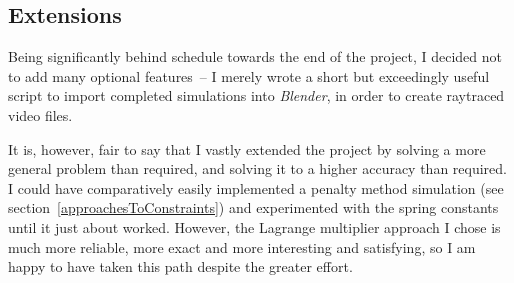 \subsection{Extensions}

Being significantly behind schedule towards the end of the project, I decided not to add many
optional features~-- I merely wrote a short but exceedingly useful script to import completed
simulations into \textsl{Blender}, in order to create raytraced video files.

It is, however, fair to say that I vastly extended the project by solving a more general problem
than required, and solving it to a higher accuracy than required. I could have comparatively
easily implemented a penalty method simulation (see section~\ref{approachesToConstraints}) and
experimented with the spring constants until it just about worked. However, the Lagrange
multiplier approach I chose is much more reliable, more exact and more interesting and satisfying,
so I am happy to have taken this path despite the greater effort.
